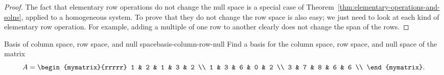 \begin{proof}
  The fact that elementary row operations do not change the null space
  is a special case of
  Theorem~\ref{thm:elementary-operations-and-solns}, applied to a
  homogeneous system. To prove that they do not change the row space
  is also easy; we just need to look at each kind of elementary row
  operation. For example, adding a multiple of one row to another
  clearly does not change the span of the rows.
\end{proof}

\begin{example}{Basis of column space, row space, and null space}{basis-column-row-null}
  Find a basis for the column space, row space, and null space of the
  matrix
  \begin{equation*}
    A =
    \begin{mymatrix}{rrrrr}
      1 & 2 & 1 & 3 & 2 \\
      1 & 3 & 6 & 0 & 2 \\
      3 & 7 & 8 & 6 & 6 \\
    \end{mymatrix}.
  \end{equation*}
\end{example}

